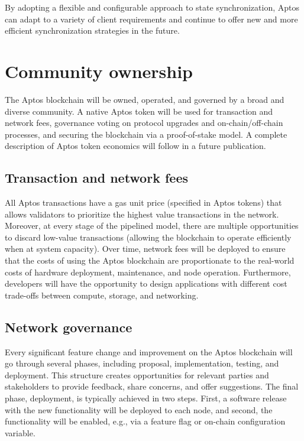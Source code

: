 \documentclass{article}
\begin{document}
By adopting a flexible and configurable approach to state synchronization, Aptos can adapt to a variety of client requirements and continue to offer new and more efficient synchronization strategies in the future.

\section{Community ownership}
\label{sec:community_ownership}

The Aptos blockchain will be owned, operated, and governed by a broad and diverse community. A native Aptos token will be used for transaction and network fees, governance voting on protocol upgrades and on-chain/off-chain processes, and securing the blockchain via a proof-of-stake model. A complete description of Aptos token economics will follow in a future publication.

\subsection{Transaction and network fees}
\label{subsec:network_fees}

All Aptos transactions have a gas unit price (specified in Aptos tokens) that allows validators to prioritize the highest value transactions in the network. Moreover, at every stage of the pipelined model, there are multiple opportunities to discard low-value transactions (allowing the blockchain to operate efficiently when at system capacity). Over time, network fees will be deployed to ensure that the costs of using the Aptos blockchain are proportionate to the real-world costs of hardware deployment, maintenance, and node operation. Furthermore, developers will have the opportunity to design applications with different cost trade-offs between compute, storage, and networking.

\subsection{Network governance}
\label{subsec:network_governance}

Every significant feature change and improvement on the Aptos blockchain will go through several phases, including proposal, implementation, testing, and deployment. This structure creates opportunities for relevant parties and stakeholders to provide feedback, share concerns, and offer suggestions. The final phase, deployment, is typically achieved in two steps. First, a software release with the new functionality will be deployed to each node, and second, the functionality will be enabled, e.g., via a feature flag or on-chain configuration variable.
\end{document}
